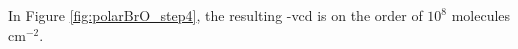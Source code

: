 

\medskip

In Figure \ref{fig:polarBrO_step4}, the resulting  -\acrshort{vcd} is on the order of $10^{8}$ molecules cm$^{-2}$. 















